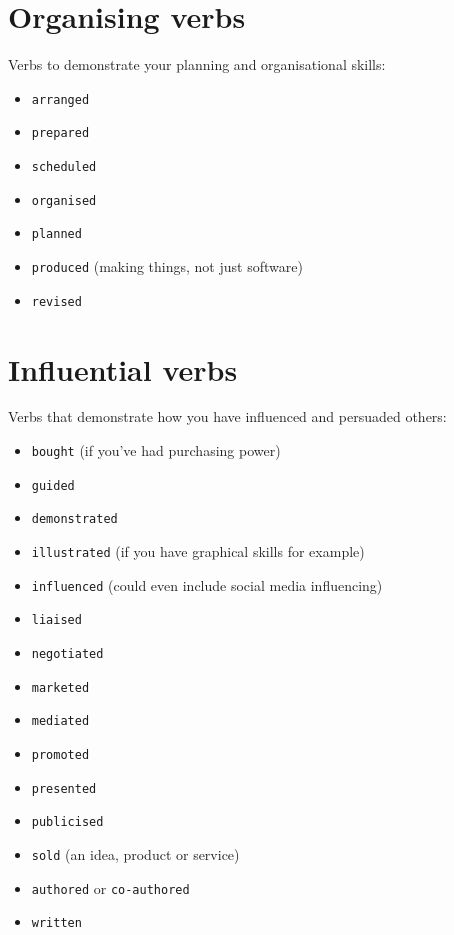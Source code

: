 \documentclass[
]{book}
\providecommand{\tightlist}{%
  \setlength{\itemsep}{0pt}\setlength{\parskip}{0pt}}
\begin{document}
\hypertarget{planning}{%
\section{Organising verbs}\label{planning}}

Verbs to demonstrate your planning and organisational skills:

\begin{itemize}
\tightlist
\item
  \texttt{arranged}
\item
  \texttt{prepared}
\item
  \texttt{scheduled}
\item
  \texttt{organised}
\item
  \texttt{planned}
\item
  \texttt{produced} (making things, not just software)
\item
  \texttt{revised}
\end{itemize}

\hypertarget{influencing}{%
\section{Influential verbs}\label{influencing}}

Verbs that demonstrate how you have influenced and persuaded others:

\begin{itemize}
\tightlist
\item
  \texttt{bought} (if you've had purchasing power)
\item
  \texttt{guided}
\item
  \texttt{demonstrated}
\item
  \texttt{illustrated} (if you have graphical skills for example)
\item
  \texttt{influenced} (could even include social media influencing)
\item
  \texttt{liaised}
\item
  \texttt{negotiated}
\item
  \texttt{marketed}
\item
  \texttt{mediated}
\item
  \texttt{promoted}
\item
  \texttt{presented}
\item
  \texttt{publicised}
\item
  \texttt{sold} (an idea, product or service)
\item
  \texttt{authored} or \texttt{co-authored}
\item
  \texttt{written}
\end{itemize}
\end{document}
